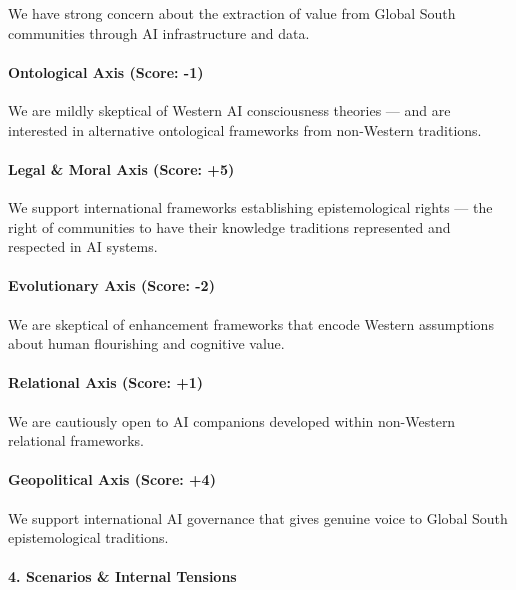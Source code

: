 We have strong concern about the extraction of value from Global South
communities through AI infrastructure and data.

\paragraph{Ontological Axis (Score:
-1)}\label{ontological-axis-score--1-2}

We are mildly skeptical of Western AI consciousness theories --- and are
interested in alternative ontological frameworks from non-Western
traditions.

\paragraph{Legal \& Moral Axis (Score:
+5)}\label{legal-moral-axis-score-5-8}

We support international frameworks establishing epistemological rights
--- the right of communities to have their knowledge traditions
represented and respected in AI systems.

\paragraph{Evolutionary Axis (Score:
-2)}\label{evolutionary-axis-score--2-7}

We are skeptical of enhancement frameworks that encode Western
assumptions about human flourishing and cognitive value.

\paragraph{Relational Axis (Score: +1)}\label{relational-axis-score-1-2}

We are cautiously open to AI companions developed within non-Western
relational frameworks.

\paragraph{Geopolitical Axis (Score:
+4)}\label{geopolitical-axis-score-4-2}

We support international AI governance that gives genuine voice to
Global South epistemological traditions.

\paragraph{4. Scenarios \& Internal
Tensions}\label{scenarios-internal-tensions-47}

